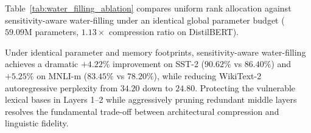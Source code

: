Table~\ref{tab:water_filling_ablation} compares uniform rank allocation against sensitivity-aware water-filling under an identical global parameter budget ($59.09\text{M}$ parameters, $1.13\times$ compression ratio on DistilBERT).

\begin{table}[t]
\centering
\caption[Uniform vs. Sensitivity-Aware Water-Filling Rank Allocation]{\textbf{Uniform vs. Sensitivity-Aware Water-Filling Rank Allocation on DistilBERT.} Parameter budget fixed at $59.09\text{M}$ parameters ($1.13\times$ compression). SST-2 and MNLI-m represent post-distillation classification accuracy. WikiText-2 measures language modeling perplexity ($\downarrow$) on GPT-2 ($1.15\times$ compression).}
\label{tab:water_filling_ablation}
\end{table}

Under identical parameter and memory footprints, sensitivity-aware water-filling achieves a dramatic $\mathbf{+4.22\%}$ improvement on SST-2 ($90.62\%$ vs $86.40\%$) and $\mathbf{+5.25\%}$ on MNLI-m ($83.45\%$ vs $78.20\%$), while reducing WikiText-2 autoregressive perplexity from $34.20$ down to $\mathbf{24.80}$. Protecting the vulnerable lexical bases in Layers 1--2 while aggressively pruning redundant middle layers resolves the fundamental trade-off between architectural compression and linguistic fidelity.

